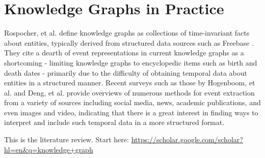 \section{Knowledge Graphs in Practice}
Rospocher, et al. define knowledge graphs as collections of time-invariant facts about entities, typically derived from structured data sources such as Freebase \cite{Rospocher2016}. They cite a dearth of event representations in current knowledge graphs as a shortcoming - limiting knowledge graphs to encyclopedic items such as birth and death dates - primarily due to the difficulty of obtaining temporal data about entities in a structured manner. Recent surveys such as those by Hogenboom, et al. \cite{Hogenboom2016} and Deng, et al. \cite{Deng2015} provide overviews of numerous methods for event extraction from a variety of sources including social media, news, academic publications, and even images and video, indicating that there is a great interest in finding ways to interpret and include such temporal data in a more structured format.

This is the literature review. Start here: \url{https://scholar.google.com/scholar?hl=en&q=knowledge+graph}